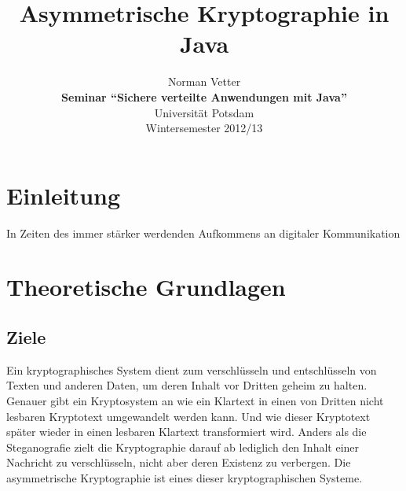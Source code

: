 \documentclass[paper=a4,11pt,german]{scrartcl} %
\begin{document}
%
\title{Asymmetrische Kryptographie in Java}

\author{Norman Vetter\\
\textbf{Seminar "`Sichere verteilte Anwendungen mit Java"'}\\
Universität Potsdam\\
Wintersemester 2012/13}

\date{}

\maketitle

%
\newpage
\tableofcontents
\newpage
\section{Einleitung}

In Zeiten des immer stärker werdenden Aufkommens an digitaler Kommunikation 
\section{Theoretische Grundlagen}

\subsection{Ziele}
Ein kryptographisches System dient zum verschlüsseln und entschlüsseln von Texten und anderen Daten, um deren Inhalt vor Dritten geheim zu halten. Genauer gibt ein Kryptosystem an wie ein Klartext in einen von Dritten nicht lesbaren Kryptotext umgewandelt werden kann. Und wie dieser Kryptotext später wieder in einen lesbaren Klartext transformiert wird. Anders als die Steganografie zielt die Kryptographie darauf ab lediglich den Inhalt einer Nachricht zu verschlüsseln, nicht aber deren Existenz zu verbergen. Die asymmetrische Kryptographie ist eines dieser kryptographischen Systeme.
\end{document}
